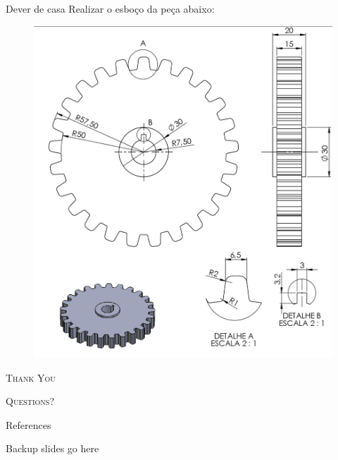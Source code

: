 \documentclass{cubeamer}
\begin{document}
\begin{frame}{Dever de casa}
    Realizar o esboço da peça abaixo:
    \newline
    \begin{center}
        \begin{figure}
            \centering
            \includegraphics[height = 0.6\textheight]{img/dever2.png}
        \end{figure}
    \end{center}
    
\end{frame}


\begin{frame}[standout]
    \Huge\textsc{Thank You}
    
    \vfill
    
    \LARGE\textsc{Questions?}
\end{frame}
\begin{frame}[t, allowframebreaks]{References}
    
    
\end{frame}

\appendix

\begin{frame}{Backup slides go here}
    
\end{frame}
\end{document}

